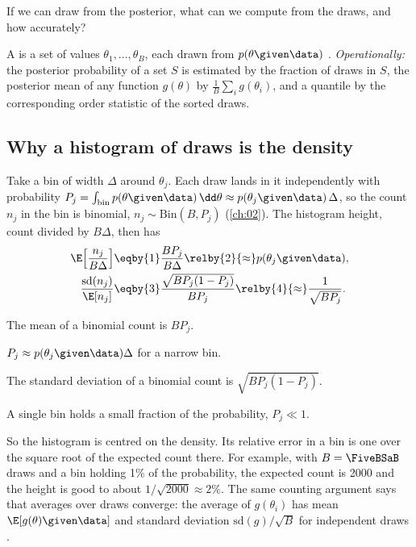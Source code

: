 If we can draw from the posterior, what can we compute from the
draws, and how accurately?

\begin{workdef}
A  is a set of values $\theta_1,\dots,\theta_B$, each drawn from
$p(\theta\given\data)$ . \emph{Operationally:} the
posterior probability of a set $S$ is estimated by the fraction of draws in $S$, the
posterior mean of any function $g(\theta)$ by $\frac1B\sum_ig(\theta_i)$, and a quantile
by the corresponding order statistic of the sorted draws.
\end{workdef}

\subsection{Why a histogram of draws is the density}

Take a bin of width $\Delta$ around $\theta_j$. Each draw lands in it independently with
probability $P_j=\int_{\text{bin}}p(\theta\given\data)\,\dd\theta\approx p(\theta_j\given
\data)\,\Delta$, so the count $n_j$ in the bin is binomial, $n_j\sim\mathrm{Bin}(B,P_j)$
(\cref{ch:02}). The histogram height, count divided by $B\Delta$, then has
\begin{align*}
  \E\Bigl[\frac{n_j}{B\Delta}\Bigr]
  &\eqby{1}\frac{BP_j}{B\Delta}\relby{2}{\approx} p(\theta_j\given\data),
  \\
  \frac{\text{sd}(n_j)}{\E[n_j]}
  &\eqby{3}\frac{\sqrt{BP_j(1-P_j)}}{BP_j}
   \relby{4}{\approx}\frac{1}{\sqrt{BP_j}} .
\end{align*}
\begin{explain}
  \item The mean of a binomial count is $BP_j$.
  \item $P_j\approx p(\theta_j\given\data)\Delta$ for a narrow bin.
  \item The standard deviation of a binomial count is $\sqrt{BP_j(1-P_j)}$.
  \item A single bin holds a small fraction of the probability, $P_j\ll1$.
\end{explain}
So the histogram is centred on the density. Its relative error in a bin is one over the
square root of the expected count there. For example, with $B=\FiveBSaB$ draws and a bin
holding 1\% of the probability, the expected count is 2000 and the height is good to
about $1/\sqrt{2000}\approx2\%$. The
same counting argument says that averages over draws converge: the average of $g(\theta_i)$
has mean $\E[g(\theta)\given\data]$ and standard deviation $\text{sd}(g)/\sqrt B$ for
independent draws .

